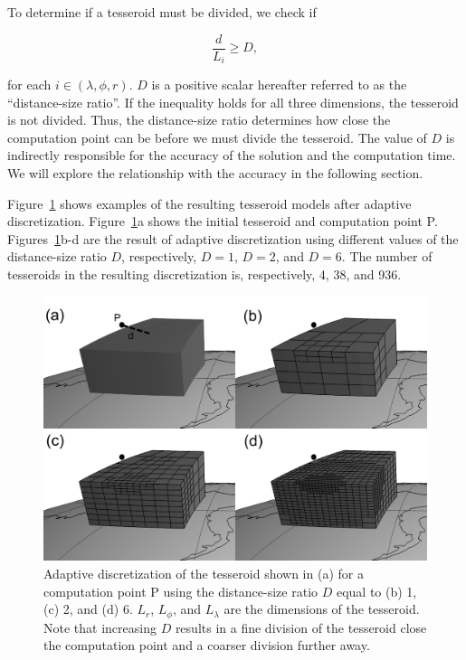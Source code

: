 \documentclass[manuscript,endfloat]{geophysics}
\begin{document}
To determine if a tesseroid must be divided,
we check if

\begin{equation}
    \frac{d}{L_i} \geq D,
    \label{eq:condition}
\end{equation}

\noindent
for each $i \in (\lambda, \phi, r)$.
$D$ is a positive scalar
hereafter referred to as the ``distance-size ratio''.
If the inequality holds for all three dimensions,
the tesseroid is not divided.
Thus, the distance-size ratio determines
how close the computation point can be
before we must divide the tesseroid.
The value of $D$ is indirectly responsible for
the accuracy of the solution and the computation time.
We will explore the relationship with the accuracy in the following section.

Figure~\ref{fig:division} shows examples of
the resulting tesseroid models after adaptive discretization.
Figure~\ref{fig:division}a shows
the initial tesseroid and computation point P.
Figures~\ref{fig:division}b-d are
the result of adaptive discretization using
different values of the distance-size ratio $D$,
respectively,
$D=1$, $D=2$, and $D=6$.
The number of tesseroids in the resulting discretization is, respectively,
4, 38, and 936.

\begin{figure}
    \centering
    \includegraphics{figs/tesseroid-split}
    \caption{
        Adaptive discretization
        of the tesseroid shown in (a)
        for a computation point P
        using the distance-size ratio $D$ equal to
        (b) 1, (c) 2, and (d) 6.
        $L_r$, $L_\phi$, and $L_\lambda$ are the dimensions of the tesseroid.
        Note that increasing $D$
        results in a fine division of the tesseroid
        close the computation point
        and a coarser division further away.
    }
    \label{fig:division}
\end{figure}
\end{document}

